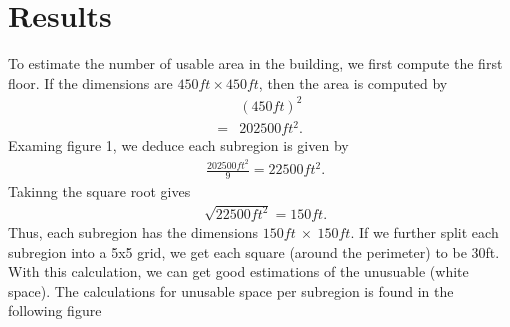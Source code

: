 \documentclass{report}
\begin{document}
    \section{Results}
    \bigbreak \noindent 
    To estimate the number of usable area in the building, we first compute the first floor. If the dimensions are $450ft \times 450ft $, then the area is computed by
    \begin{align*}
        &(450ft)^{2} \\
        =&202500ft^{2}
    .\end{align*}
    \bigbreak \noindent 
    Examing figure 1, we deduce each subregion is given by
    \begin{align*}
        &\frac{202500ft^{2}}{9} =22500ft^{2}
    .\end{align*}
    Takinng the square root gives
    \begin{align*}
        &\sqrt{22500ft^{2}} =150ft
    .\end{align*}
    Thus, each subregion has the dimensions $150ft\ \times\ 150ft$. If we further split each subregion into a 5x5 grid, we get each square (around the perimeter) to be 30ft. With this calculation, we can get good estimations of the unusuable (white space). The calculations for unusable space per subregion is found in the following figure
    \bigbreak \noindent 
    \begin{figure}[ht]
        \centering
        \label{fig:figure1}
    \end{figure}
\end{document}
